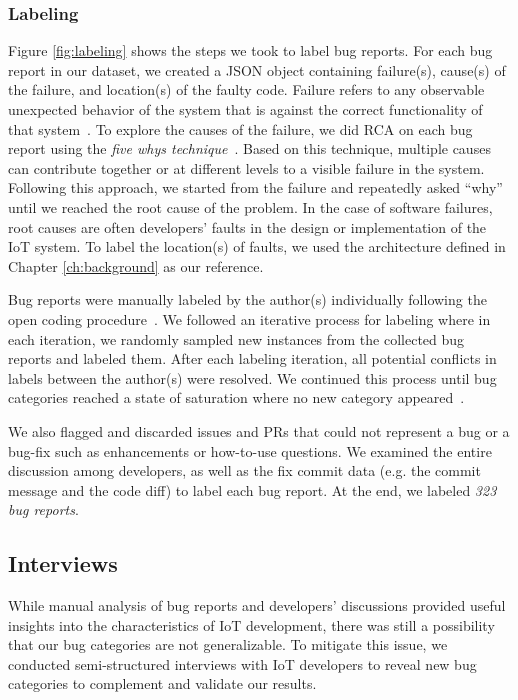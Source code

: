 \subsubsection{Labeling} 
Figure \autoref{fig:labeling} shows the steps we took to label bug reports. For each bug report in our dataset, we created a JSON object containing failure(s), cause(s) of the failure, and location(s) of the faulty code. Failure refers to any observable unexpected behavior of the system that is against the correct functionality of that system~\cite{bugCharOpenSoftware,failureDefinition}. To explore the causes of the failure, we did RCA on each bug report using the \emph{five whys technique}~\cite{serrat2017five}. Based on this technique, multiple causes can contribute together or at different levels to a visible failure in the system. Following this approach, we started from the failure and repeatedly asked ``why'' until we reached the root cause of the problem. In the case of software failures, root causes are often developers' faults in the design or implementation of the IoT system. To label the location(s) of faults, we used the architecture defined in Chapter \ref{ch:background} as our reference. 

Bug reports were manually labeled by the author(s) individually following the open coding procedure~\cite{qualitativeStudySE}. We followed an iterative process for labeling where in each iteration, we randomly sampled new instances from the collected bug reports and labeled them. After each labeling iteration, all potential conflicts in labels between the author(s) were resolved. We continued this process until bug categories reached a state of saturation where no new category appeared~\cite{dataSaturationFusch}. 

We also flagged and discarded issues and PRs that could not represent a bug or a bug-fix such as enhancements or how-to-use questions. We examined the entire discussion among developers, as well as the fix commit data (e.g. the commit message and the code diff) to label each bug report. At the end, we labeled \emph{323 bug reports}.


\subsection{Interviews} \label{interviews4Bug}
 While manual analysis of bug reports and developers' discussions provided useful insights into the characteristics of IoT development, there was still a possibility that our bug categories are not generalizable. To mitigate this issue, we conducted semi-structured interviews with IoT developers to reveal new bug categories to complement and validate our results. 

